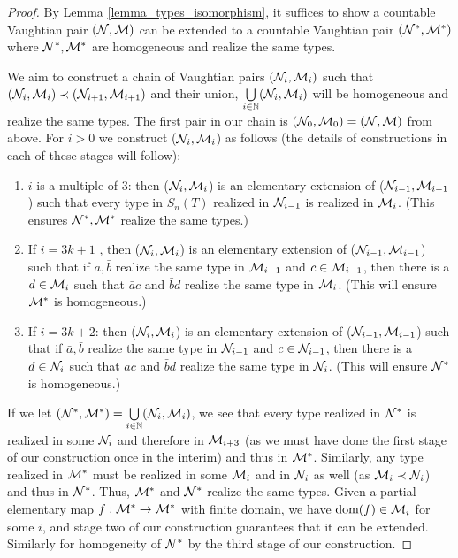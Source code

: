 \begin{proof}
By Lemma \ref{lemma_types_isomorphism}, it suffices to show a countable Vaughtian pair \((\mathcal{N}, \mathcal{M})\) can be extended to a countable Vaughtian pair \((\mathcal{N}^*, \mathcal{M}^*)\) where \(\mathcal{N}^*, \mathcal{M}^*\) are homogeneous and realize the same types. 

We aim to construct a chain of Vaughtian pairs \((\mathcal{N}_i, \mathcal{M}_i)\) such that \((\mathcal{N}_i, \mathcal{M}_i) \prec (\mathcal{N}_{i+1}, \mathcal{M}_{i+1})\) and their union, \(\bigcup\limits_{i\in \mathbb{N}} (\mathcal{N}_i, \mathcal{M}_i)\) will be homogeneous and realize the same types. 
The first pair in our chain is \((\mathcal{N}_0, \mathcal{M}_0) = (\mathcal{N}, \mathcal{M})\) from above. 
For \(i > 0\) we construct (\(\mathcal{N}_i, \mathcal{M}_i\)) as follows (the details of constructions in each of these stages will follow):

\begin{enumerate}

  \item  \(i\) is a multiple of 3: then (\(\mathcal{N}_i, \mathcal{M}_i\)) is an elementary extension of (\(\mathcal{N}_{i-1}, \mathcal{M}_{i-1}\)) such that every type in \(S_n(T)\) realized in \(\mathcal{N}_{i-1}\) is realized in \(\mathcal{M}_i\). (This ensures \(\mathcal{N}^*, \mathcal{M}^*\) realize the same types.)

  \item  If \(i = 3k+1\) , then (\(\mathcal{N}_i, \mathcal{M}_i\)) is an elementary extension of (\(\mathcal{N}_{i-1}, \mathcal{M}_{i-1}\)) such that if \(\bar{a}, \bar{b}\) realize the same type in \(\mathcal{M}_{i-1}\) and \(c \in \mathcal{M}_{i-1}\), then there is a \(d \in \mathcal{M}_i\) such that \(\bar{a}c\) and \(\bar{b}d\) realize the same type in \(\mathcal{M}_i\). (This will ensure \(\mathcal{M}^*\) is homogeneous.) 

  \item If \(i = 3k + 2\): then (\(\mathcal{N}_i, \mathcal{M}_i\)) is an elementary extension of (\(\mathcal{N}_{i-1}, \mathcal{M}_{i-1}\)) such that if \(\bar{a}, \bar{b}\) realize the same type in \(\mathcal{N}_{i-1}\) and \(c \in \mathcal{N}_{i-1}\), then there is a \(d \in \mathcal{N}_i\) such that \(\bar{a}c\) and \(\bar{b}d\) realize the same type in \(\mathcal{N}_i\). (This will ensure \(\mathcal{N}^*\) is homogeneous.) 

\end{enumerate}

If we let \((\mathcal{N}^*, \mathcal{M}^*) = \bigcup\limits_{i \in \mathbb{N}}(\mathcal{N}_i, \mathcal{M}_i)\), we see that every type realized in \(\mathcal{N}^*\) is realized in some \(\mathcal{N}_i\) and therefore in \(\mathcal{M}_{i+3}\) (as we must have done the first stage of our construction once in the interim) and thus in \(\mathcal{M}^*\). 
Similarly, any type realized in \(\mathcal{M}^*\) must be realized in some \(\mathcal{M}_i\) and in \(\mathcal{N}_i\) as well (as \(\mathcal{M}_i \prec \mathcal{N}_i\)) and thus in \(\mathcal{N}^*\).
Thus, \(\mathcal{M}^*\) and  \(\mathcal{N}^*\) realize the same types.  
Given a partial elementary map \(f:\mathcal{M}^* \to \mathcal{M}^*\) with finite domain, we have \(\text{dom}(f) \in \mathcal{M}_i\) for some \(i\), and stage two of our construction guarantees that it can be extended. 
Similarly for homogeneity of \(\mathcal{N}^*\) by the third stage of our construction. 


\end{proof}
